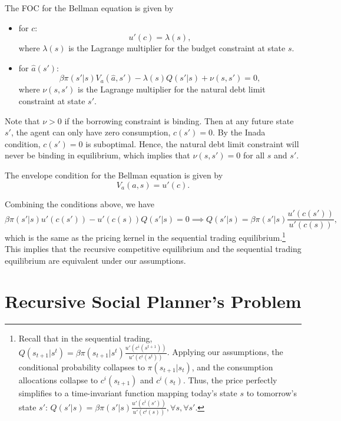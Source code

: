 The FOC for the Bellman equation is given by
\begin{itemize}
    \item for $c$:
    \[
    u'(c) = \lambda(s),
    \]
    where $\lambda(s)$ is the Lagrange multiplier for the budget constraint at state $s$.
    \item for $\hat a(s')$:
    \[
    \beta \pi(s'|s) V_a(\hat a,s') - \lambda(s) Q(s'|s) + \nu(s,s') = 0,
    \]
where $\nu(s,s')$ is the Lagrange multiplier for the natural debt limit constraint at state $s'$.
\end{itemize}

Note that $\nu>0$ if the borrowing constraint is binding. Then at any future state $s'$, the agent can only have zero consumption, $c(s') = 0$. By the Inada condition, $c(s') = 0$ is suboptimal. Hence, the natural debt limit constraint will never be binding in equilibrium, which implies that $\nu(s,s') = 0$ for all $s$ and $s'$.

The envelope condition for the Bellman equation is given by
\[
V_a(a,s) = u'(c).
\]

Combining the conditions above, we have
\[
\beta \pi(s'|s)u'(c(s')) - u'(c(s))Q(s'|s) = 0  \implies  Q(s'|s) = \beta \pi(s'|s)\frac{u'(c(s'))}{u'(c(s))},
\]
which is the same as the pricing kernel in the sequential trading equilibrium.\footnote{
Recall that in the sequential trading, $Q(s_{t+1}|s^t) =  \beta \pi(s_{t+1}|s^t) \frac{u'(c^i(s^{t+1}))}{u'(c^i(s^t))}$. Applying our assumptions, the conditional probability collapses to $\pi(s_{t+1}|s_t)$, and the consumption allocations collapse to $c^i(s_{t+1})$ and $c^i(s_t)$. Thus, the price perfectly simplifies to a time-invariant function mapping today's state $s$ to tomorrow's state $s'$: $Q(s'|s) =  \beta \pi(s'|s) \frac{u'(c^i(s'))}{u'(c^i(s))}, \forall s, \forall s'$.
} This implies that the recursive competitive equilibrium and the sequential trading equilibrium are equivalent under our assumptions.

\section{Recursive Social Planner's Problem}

